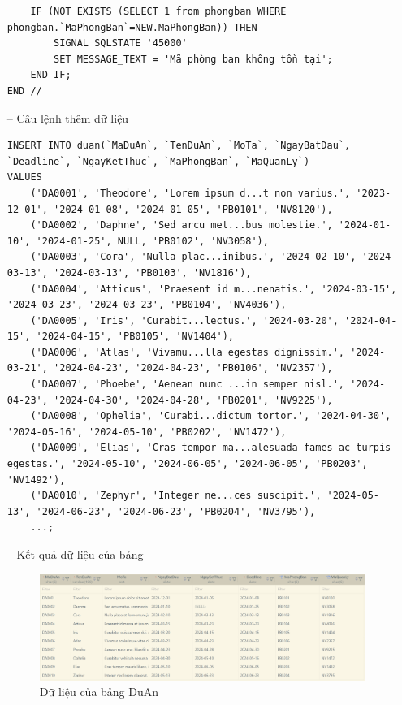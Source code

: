 \begin{itemize}
\begin{verbatim}
    IF (NOT EXISTS (SELECT 1 from phongban WHERE phongban.`MaPhongBan`=NEW.MaPhongBan)) THEN
        SIGNAL SQLSTATE '45000'
        SET MESSAGE_TEXT = 'Mã phòng ban không tồn tại';
    END IF;
END //
\end{verbatim}
    \newpage
    \item [--] Câu lệnh thêm dữ liệu
    \begin{verbatim}
INSERT INTO duan(`MaDuAn`, `TenDuAn`, `MoTa`, `NgayBatDau`, `Deadline`, `NgayKetThuc`, `MaPhongBan`, `MaQuanLy`)
VALUES 
    ('DA0001', 'Theodore', 'Lorem ipsum d...t non varius.', '2023-12-01', '2024-01-08', '2024-01-05', 'PB0101', 'NV8120'),
    ('DA0002', 'Daphne', 'Sed arcu met...bus molestie.', '2024-01-10', '2024-01-25', NULL, 'PB0102', 'NV3058'),
    ('DA0003', 'Cora', 'Nulla plac...inibus.', '2024-02-10', '2024-03-13', '2024-03-13', 'PB0103', 'NV1816'),
    ('DA0004', 'Atticus', 'Praesent id m...nenatis.', '2024-03-15', '2024-03-23', '2024-03-23', 'PB0104', 'NV4036'),
    ('DA0005', 'Iris', 'Curabit...lectus.', '2024-03-20', '2024-04-15', '2024-04-15', 'PB0105', 'NV1404'),
    ('DA0006', 'Atlas', 'Vivamu...lla egestas dignissim.', '2024-03-21', '2024-04-23', '2024-04-23', 'PB0106', 'NV2357'),
    ('DA0007', 'Phoebe', 'Aenean nunc ...in semper nisl.', '2024-04-23', '2024-04-30', '2024-04-28', 'PB0201', 'NV9225'),
    ('DA0008', 'Ophelia', 'Curabi...dictum tortor.', '2024-04-30', '2024-05-16', '2024-05-10', 'PB0202', 'NV1472'),
    ('DA0009', 'Elias', 'Cras tempor ma...alesuada fames ac turpis egestas.', '2024-05-10', '2024-06-05', '2024-06-05', 'PB0203', 'NV1492'),
    ('DA0010', 'Zephyr', 'Integer ne...ces suscipit.', '2024-05-13', '2024-06-23', '2024-06-23', 'PB0204', 'NV3795'),
    ...;
    \end{verbatim}
    \item [--] Kết quả dữ liệu của bảng
    \begin{figure}[H]
        \centering
        \includegraphics[width=1\linewidth]{content/images/data_duan.png}
        \caption{Dữ liệu của bảng DuAn}
        \label{fig:data_duan}
    \end{figure}
\end{itemize}
